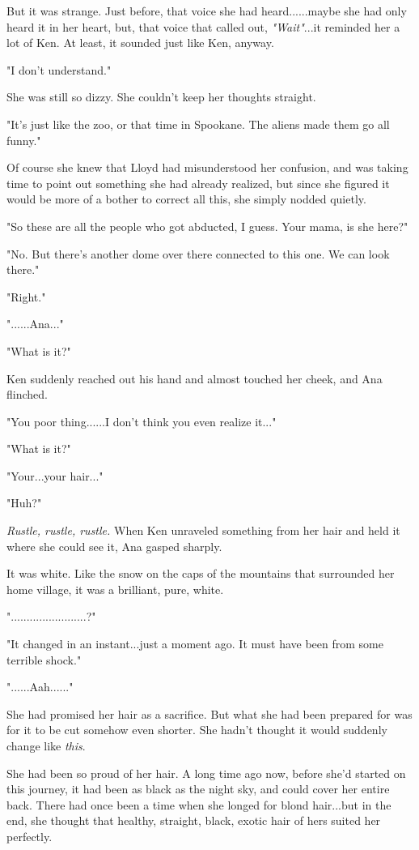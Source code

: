 \documentclass[
]{article}
\begin{document}
But it was strange. Just before, that voice she had heard......maybe she
had only heard it in her heart, but, that voice that called out,
\emph{"Wait"}...it reminded her a lot of Ken. At least, it sounded just
like Ken, anyway.

"I don't understand."

She was still so dizzy. She couldn't keep her thoughts straight.

"It's just like the zoo, or that time in Spookane. The aliens made them
go all funny."

Of course she knew that Lloyd had misunderstood her confusion, and was
taking time to point out something she had already realized, but since
she figured it would be more of a bother to correct all this, she simply
nodded quietly.

"So these are all the people who got abducted, I guess. Your mama, is
she here?"

"No. But there's another dome over there connected to this one. We can
look there."

"Right."

"......Ana..."

"What is it?"

Ken suddenly reached out his hand and almost touched her cheek, and Ana
flinched.

"You poor thing......I don't think you even realize it..."

"What is it?"

"Your...your hair..."

"Huh?"

\emph{Rustle, rustle, rustle.} When Ken unraveled something from her
hair and held it where she could see it, Ana gasped sharply.

It was white. Like the snow on the caps of the mountains that surrounded
her home village, it was a brilliant, pure, white.

"........................?"

"It changed in an instant...just a moment ago. It must have been from
some terrible shock."

"......Aah......"

She had promised her hair as a sacrifice. But what she had been prepared
for was for it to be cut somehow even shorter. She hadn't thought it
would suddenly change like \emph{this}.

She had been so proud of her hair. A long time ago now, before she'd
started on this journey, it had been as black as the night sky, and
could cover her entire back. There had once been a time when she longed
for blond hair...but in the end, she thought that healthy, straight,
black, exotic hair of hers suited her perfectly.
\end{document}
